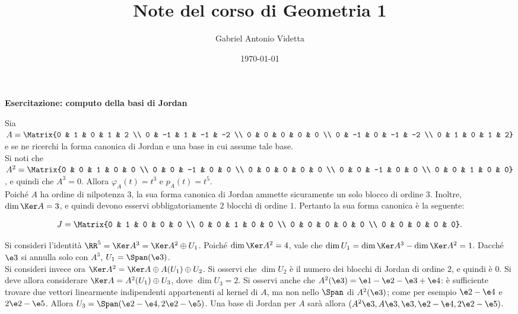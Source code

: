 \documentclass[11pt]{article}
\title{\textbf{Note del corso di Geometria 1}}
\author{Gabriel Antonio Videtta}
\date{\today}
\begin{document}
	
	\maketitle
	
	\wip
	
	\begin{center}
		\Large \textbf{Esercitazione: computo della basi di Jordan}
	\end{center}

	\begin{example}
		Sia $A = \Matrix{0 & 1 & 0 & 1 & 2 \\ 0 & -1 & 1 & -1 & -2 \\ 0 & 0 & 0 & 0 & 0 \\ 0 & -1 & 0 & -1 & -2 \\ 0 & 1 & 0 & 1 & 2}$ e se ne ricerchi
		la forma canonica di Jordan e una base in cui assume tale base. \\
		
		Si noti che $A^2 = \Matrix{0 & 0 & 1 & 0 & 0 \\ 0 & 0 & -1 & 0 & 0 \\ 0 & 0 & 0 & 0 & 0 \\ 0 & 0 & -1 & 0 & 0 \\ 0 & 0 & 1 & 0 & 0}$, e quindi
		che $A^3 = 0$. Allora $\varphi_A(t) = t^3$ e $p_A(t) = t^5$. \\
		
		Poiché $A$ ha ordine di nilpotenza $3$, la sua forma canonica
		di Jordan ammette sicuramente un solo blocco
		di ordine $3$. Inoltre, $\dim \Ker A = 3$, e quindi
		devono esservi obbligatoriamente $2$ blocchi di ordine $1$.
		Pertanto la sua forma canonica è la seguente:
		
		\[ J=\Matrix{0 & 1 & 0 & 0 & 0 \\ 0 & 0 & 1 & 0 & 0 \\ 0 & 0 & 0 & 0 & 0 \\ 0 & 0 & 0 & 0 & 0}. \]
		
		\vskip 0.05in
		
		Si consideri l'identità $\RR^5 = \Ker A^3 = \Ker A^2 \oplus U_1$.
		Poiché $\dim \Ker A^2 = 4$, vale che $\dim U_1 = \dim \Ker A^3
		- \dim \Ker A^2 = 1$. Dacché $\e3$ si annulla solo con $A^3$,
		$U_1 = \Span(\e3)$. \\
		
		Si consideri invece ora $\Ker A^2 = \Ker A \oplus A(U_1) \oplus U_2$.
		Si osservi che $\dim U_2$ è il numero dei blocchi di Jordan di
		ordine $2$, e quindi è $0$. Si deve allora considerare $\Ker A =
		A^2(U_1) \oplus U_3$, dove $\dim U_3 = 2$. Si osservi anche che $A^2(\e3) = \e1-\e2-\e3+\e4$: è sufficiente trovare due vettori
		linearmente indipendenti appartenenti al kernel di $A$, ma non
		nello $\Span$ di $A^2(\e3)$; come per esempio $\e2-\e4$ e $2\e2-\e5$.
		Allora $U_3 = \Span(\e2-\e4, 2\e2-\e5)$. Una base di Jordan per $A$
		sarà allora $(A^2 \e3, A \e3, \e3, \e2-\e4, 2\e2-\e5)$.
	\end{example}
\end{document}
